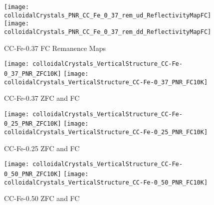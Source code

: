 \documentclass[\main/dresen_thesis.tex]{subfiles}
\begin{document}
  \label{sec:colloidalCrystals:layers:pnr}

  \begin{figure}[tb]
    \centering
    \texttt{[image: colloidalCrystals\_PNR\_CC\_Fe\_0\_37\_rem\_ud\_ReflectivityMapFC]}
    \texttt{[image: colloidalCrystals\_PNR\_CC\_Fe\_0\_37\_rem\_dd\_ReflectivityMapFC]}
    \caption{\label{fig:colloidalCrystals:pnr} CC-Fe-0.37 FC Remanence Maps}
  \end{figure}


  \begin{figure}[tb]
    \centering
    \texttt{[image: colloidalCrystals\_VerticalStructure\_CC-Fe-0\_37\_PNR\_ZFC10K]}
    \texttt{[image: colloidalCrystals\_VerticalStructure\_CC-Fe-0\_37\_PNR\_FC10K]}
    \caption{\label{fig:colloidalCrystals:pnr} CC-Fe-0.37 ZFC and FC}
  \end{figure}

  \begin{figure}[tb]
    \centering
    \texttt{[image: colloidalCrystals\_VerticalStructure\_CC-Fe-0\_25\_PNR\_ZFC10K]}
    \texttt{[image: colloidalCrystals\_VerticalStructure\_CC-Fe-0\_25\_PNR\_FC10K]}
    \caption{\label{fig:colloidalCrystals:pnr} CC-Fe-0.25 ZFC and FC}
  \end{figure}

  \begin{figure}[tb]
    \centering
    \texttt{[image: colloidalCrystals\_VerticalStructure\_CC-Fe-0\_50\_PNR\_ZFC10K]}
    \texttt{[image: colloidalCrystals\_VerticalStructure\_CC-Fe-0\_50\_PNR\_FC10K]}
    \caption{\label{fig:colloidalCrystals:pnr} CC-Fe-0.50 ZFC and FC}
  \end{figure}
\end{document}
